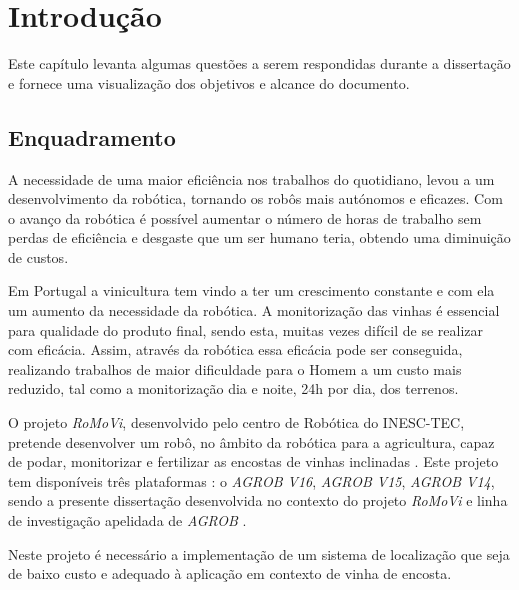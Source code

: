 \chapter{Introdução} \label{chap:introdução}
Este capítulo levanta algumas questões a serem respondidas durante a dissertação e fornece uma  visualização dos objetivos e alcance do documento.

\section{Enquadramento} \label{sec:enquadramento}

A necessidade de uma maior eficiência nos trabalhos do quotidiano, levou a um desenvolvimento da robótica, tornando os robôs mais autónomos e eficazes. Com o avanço da robótica é possível aumentar o número de horas de trabalho sem perdas de eficiência e desgaste que um ser humano teria, obtendo uma diminuição de custos.

Em Portugal a vinicultura tem vindo a ter um crescimento constante e com ela um aumento da necessidade da robótica. A monitorização das vinhas é essencial para qualidade do produto final, sendo esta, muitas vezes difícil de se realizar com eficácia. Assim,  através da robótica essa eficácia pode ser conseguida, realizando trabalhos de maior dificuldade para o Homem a um custo mais reduzido, tal como a monitorização dia e noite, 24h por dia,  dos terrenos. 

O projeto \textit{RoMoVi}, desenvolvido pelo centro de Robótica do INESC-TEC, pretende desenvolver um robô, no âmbito da robótica para a agricultura, capaz de podar, monitorizar e fertilizar as encostas de vinhas inclinadas \cite{Mendes2016}. Este projeto tem disponíveis três plataformas : o \textit{AGROB V16}, \textit{AGROB V15}, \textit{AGROB V14}, sendo a presente dissertação desenvolvida no contexto do projeto \textit{RoMoVi} e linha de investigação apelidada de \textit{AGROB} \cite{RN32}.

Neste projeto é necessário a implementação de um sistema de localização que seja de baixo custo e adequado à aplicação em contexto de vinha de encosta.

